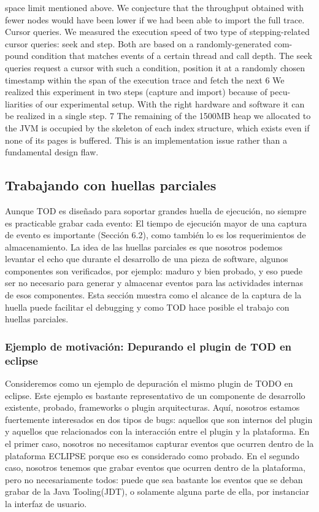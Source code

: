 \documentclass[12pt,legalpaper]{report}
\begin{document}
space limit mentioned above. We conjecture that the throughput obtained with
fewer nodes would have been lower if we had been able to import the full trace.
Cursor queries. We measured the execution speed of two type of stepping-related
cursor queries: seek and step. Both are based on a randomly-generated com-
pound condition that matches events of a certain thread and call depth. The
seek queries request a cursor with such a condition, position it at a randomly
chosen timestamp within the span of the execution trace and fetch the next
 6
   We realized this experiment in two steps (capture and import) because of pecu-
   liarities of our experimental setup. With the right hardware and software it can be
   realized in a single step.
 7
   The remaining of the 1500MB heap we allocated to the JVM is occupied by the
   skeleton of each index structure, which exists even if none of its pages is buffered.
   This is an implementation issue rather than a fundamental design flaw.






		\subsection{Trabajando con huellas parciales}

	Aunque TOD es diseñado para soportar grandes huella de ejecución, no siempre es practicable grabar cada evento:  El tiempo de ejecución mayor de una captura de evento es importante (Sección 6.2), como también lo es los requerimientos de almacenamiento.  La idea de las huellas parciales es que nosotros podemos levantar el echo que durante el desarrollo de una pieza de software, algunos componentes son verificados, por ejemplo: maduro y bien probado, y eso puede ser no necesario para generar y almacenar eventos para las actividades internas de esos componentes.  Esta sección muestra como el alcance de la captura de la huella puede facilitar el debugging y como TOD hace posible el trabajo con huellas parciales.

			\subsubsection[Ejemplo de motivación]{Ejemplo de motivación: Depurando el plugin de TOD en eclipse}

Consideremos como un ejemplo de depuración el mismo plugin de TODO en eclipse.  Este ejemplo es bastante representativo de un componente de desarrollo existente, probado, frameworks o plugin arquitecturas.  Aquí, nosotros estamos fuertemente interesados en dos tipos de bugs:  aquellos que son internos del plugin y aquellos que relacionados con la interacción entre el plugin y la plataforma.  En el primer caso, nosotros no necesitamos capturar eventos que ocurren dentro de la plataforma ECLIPSE porque eso es considerado como probado.  En el segundo caso, nosotros tenemos que grabar eventos que ocurren dentro de la plataforma, pero no necesariamente todos:  puede que sea bastante los eventos que se deban grabar de la Java Tooling(JDT), o solamente alguna parte de ella, por instanciar la interfaz de usuario.
\end{document}
